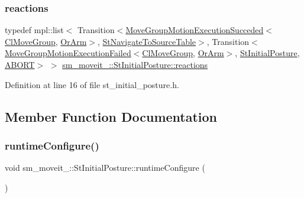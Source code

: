 \subsubsection{\texorpdfstring{reactions}{reactions}}
{\footnotesize\ttfamily typedef mpl\+::list$<$ Transition$<$\hyperlink{structmoveit__z__client_1_1MoveGroupMotionExecutionSucceded}{Move\+Group\+Motion\+Execution\+Succeded}$<$\hyperlink{classmoveit__z__client_1_1ClMoveGroup}{Cl\+Move\+Group}, \hyperlink{classsm__moveit__4_1_1OrArm}{Or\+Arm}$>$, \hyperlink{structsm__moveit__4_1_1StNavigateToSourceTable}{St\+Navigate\+To\+Source\+Table}$>$, Transition$<$\hyperlink{structmoveit__z__client_1_1MoveGroupMotionExecutionFailed}{Move\+Group\+Motion\+Execution\+Failed}$<$\hyperlink{classmoveit__z__client_1_1ClMoveGroup}{Cl\+Move\+Group}, \hyperlink{classsm__moveit__4_1_1OrArm}{Or\+Arm}$>$, \hyperlink{structsm__moveit__4_1_1StInitialPosture}{St\+Initial\+Posture}, \hyperlink{classABORT}{A\+B\+O\+RT}$>$ $>$ \hyperlink{structsm__moveit__4_1_1StInitialPosture_aba6b4f6994263b0b57c50986b9db3497}{sm\+\_\+moveit\+\_\+::\+St\+Initial\+Posture\+::reactions}}



Definition at line 16 of file st\+\_\+initial\+\_\+posture.\+h.



\subsection{Member Function Documentation}
\mbox{\label{structsm__moveit__4_1_1StInitialPosture_a0ba0a6fc206c11bfdd8d64594290b386}} 
\subsubsection{\texorpdfstring{runtime\+Configure()}{runtimeConfigure()}}
{\footnotesize\ttfamily void sm\+\_\+moveit\+\_\+::\+St\+Initial\+Posture\+::runtime\+Configure (\begin{DoxyParamCaption}{ }\end{DoxyParamCaption})\hspace{0.3cm}{\ttfamily [inline]}}



